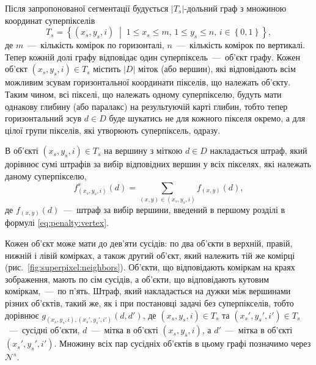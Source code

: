 Після запропонованої сегментації будується
$\left| T_s \right|$-дольний граф з множиною координат суперпікселів
\begin{equation*}
    T_s = \left\{
        \left(x_s, y_s, i \right) \; \middle| \;
        1 \le x_s \le m, \,
        1 \le y_s \le n, \,
        i \in \left\{ 0, 1 \right\}
    \right\},
\end{equation*}
де $m$~---~кількість комірок по горизонталі,
$n$~---~кількість комірок по вертикалі.
Тепер кожній долі графу відповідає один суперпіксель~---~об'єкт графу.
Кожен об'єкт $\left(x_s, y_s, i \right) \in T_s$ містить
$ \left| D \right|$ міток (або вершин),
які відповідають всім можливим зсувам горизонтальної координати пікселів,
що належать об'єкту.
Таким чином, всі пікселі, що належать одному суперпікселю,
будуть мати однакову глибину (або паралакс) на результуючій карті глибин,
тобто тепер горизонтальний зсув $d \in D$
буде шукатись не для кожного пікселя окремо, а для цілої групи пікселів,
які утворюють суперпіксель, одразу.

В об'єкті $\left(x_s, y_s, i \right) \in T_s$ на вершину з міткою $d \in D$
накладається штраф,
який дорівнює сумі штрафів за вибір відповідних вершин у всіх пікселях,
які належать даному суперпікселю,
\begin{equation*}
    f_{\left(x_s, y_s, i\right)}^s \left( d \right) =
    \sum \limits_{\left(x, y \right) \in \left(x_s, y_s, i \right)}
        f_{\left(x, y \right)} \left( d \right),
\end{equation*}
де $f_{\left(x, y \right)} \left( d \right)$~---~штраф за вибір вершини,
введений в першому розділі в формулі \eqref{eq:penalty:vertex}.

Кожен об'єкт може мати до дев'яти сусідів: по два об'єкти в верхній, правій,
нижній і лівій комірках, а також другий об'єкт,
який належить тій же комірці (рис.~\ref{fig:superpixel:neighbors}).
Об'єкти, що відповідають коміркам на краях зображення, мають по сім сусідів,
а об'єкти, що відповідають кутовим коміркам,~---~по п'ять.
Штраф, який накладається на дужки між вершинами різних об'єктів, такий же,
як і при постановці задачі без суперпікселів, тобто дорівнює
$g_{\left(x_s, y_s, i \right), \left(x_s', y_s', i' \right)}
    \left(d, d' \right)$,
де $\left(x_s, y_s, i \right) \in T_s$ та
$\left(x_s', y_s', i' \right) \in T_s$~---~сусідні об'єкти,
$d$~---~мітка в об'єкті $\left(x_s, y_s, i \right)$,
а $d'$~---~мітка в об'єкті $\left(x_s', y_s', i' \right)$.
Множину всіх пар сусідніх об'єктів в цьому графі позначимо через $\mathcal{N}^s$.

